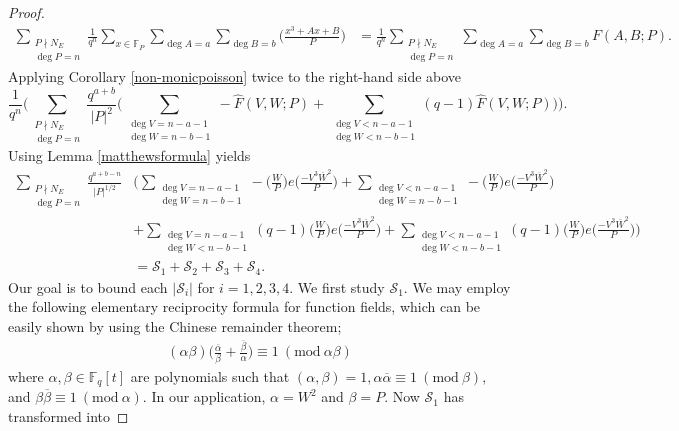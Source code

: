 \documentclass[12pt,reqno]{amsart}
\newcommand{\Mod}[1]{\ (\mathrm{mod}\ #1)}
\newcommand{\BF}{\mathbb{F}}
\newcommand{\CS}{\mathcal{S}}
\begin{document}
\begin{proof}
\begin{align*}
     \sum_{\substack{P \nmid N_E \\ \deg P =  n}} \frac{1}{q^n} \sum_{x \in \BF_{P}} \sum_{ \deg A = a} \sum_{ \deg B = b } \Big ( \frac{x^3+Ax+B}{P} \Big ) & = \frac{1}{q^n}  \sum_{\substack{P \nmid N_E \\ \deg P = n}} \sum_{ \deg A = a} \sum_{ \deg B = b } F(A,B;P).    
    \end{align*}
    Applying Corollary \ref{non-monicpoisson} twice to the right-hand side above 
    \[
    \frac{1}{q^n} \Big (\sum_{\substack{P \nmid N_E \\ \deg P = n}} \frac{q^{a+b}}{|P|^2} \Big ( \sum_{\substack{\deg V = n-a -1 \\ \deg W = n-b-1}  } -\widehat{F}(V,W;P) + \sum_{\substack{ \deg V < n - a-1 \\ \deg W < n- b -1}} (q-1) \widehat{F}(V,W;P) \Big) \Big ). 
    \]
Using Lemma \ref{matthewsformula} yields
\begin{align*}
 \sum_{\substack{P \nmid N_E \\ \deg P = n}} \frac{q^{a+b -n }}{|P|^{1/2}} & \Big ( \sum_{\substack{\deg V = n-a -1 \\ \deg W = n-b-1}} - \Big (\frac{W}{P} \Big ) e\Big ( \frac{-V^3\overline{W}^2}{P} \Big ) + \sum_{\substack{\deg V < n- a -1 \\ \deg W = n- b -1}} - \Big (\frac{W}{P} \Big ) e\Big ( \frac{-V^3\overline{W}^2}{P} \Big ) \\
& + \sum_{\substack{ \deg V = n - a -1 \\ \deg W < n- b -1}} (q-1) \Big ( \frac{W}{P} \Big ) e\Big ( \frac{-V^3\overline{W}^2}{P} \Big ) + \sum_{\substack{ \deg V < n - a -1 \\ \deg W < n-b -1}} (q-1) \Big ( \frac{W}{P} \Big ) e\Big ( \frac{-V^3\overline{W}^2}{P} \Big ) \Big) \\
& =  \CS_1 + \CS_2 + \CS_3 + \CS_4 .
\end{align*}
Our goal is to bound each $|\CS_i|$ for $i =1,2,3,4.$ We first study $\CS_1.$ We may employ the following elementary reciprocity formula for function fields, which can be easily shown by using the Chinese remainder theorem;
\begin{align}\label{elementaryformula}
(\alpha\beta) \Big ( \frac{\overline{\alpha}}{\beta} + \frac{\overline{\beta}}{\alpha} \Big ) \equiv 1 \Mod{\alpha\beta}
\end{align}
where $\alpha,\beta \in \BF_{q}[t]$ are polynomials such that $(\alpha, \beta)=1, \alpha \overline{\alpha} \equiv 1 \Mod{\beta},$ and $\beta \overline{\beta} \equiv 1 \Mod{\alpha}.$ In our application, $\alpha = W^2$ and $\beta=P.$ Now $\CS_1$ has transformed into

\end{proof}
\end{document}
